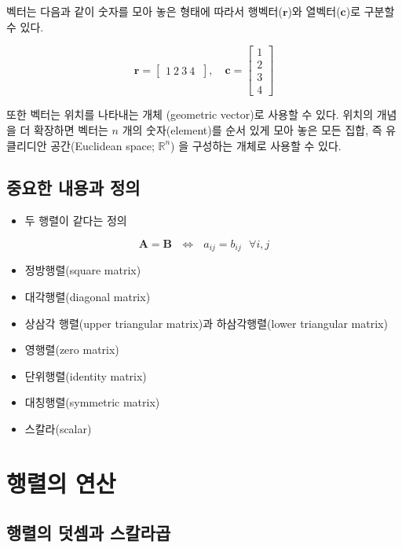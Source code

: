 \documentclass[
  11pt,
  a4paper,
  oneside]{scrbook}
\providecommand{\tightlist}{%
  \setlength{\itemsep}{0pt}\setlength{\parskip}{0pt}}\usepackage{longtable,booktabs,array}
\newcommand{\RR}{\mathbb{R}}
\theoremstyle{definition}
\theoremstyle{definition}
\theoremstyle{plain}
\theoremstyle{remark}
\begin{document}
벡터는 다음과 같이 숫자를 모아 놓은 형태에 따라서 행벡터(\(\pmb r\))와
열벡터(\(\pmb c\))로 구분할 수 있다.

\[
\pmb r = 
\begin{bmatrix}
1~ 2 ~3 ~4~
\end{bmatrix}
,\quad
\pmb c = 
\begin{bmatrix}
1 \\
2 \\
3 \\
4
\end{bmatrix}
\]

또한 벡터는 위치를 나타내는 개체 (geometric vector)로 사용할 수 있다.
위치의 개념을 더 확장하면 벡터는 \(n\) 개의 숫자(element)를 순서 있게
모아 놓은 모든 집합, 즉 유클리디안 공간(Euclidean space; \(\RR^n\)) 을
구성하는 개체로 사용할 수 있다.

\section{중요한 내용과
정의}\label{uxc911uxc694uxd55c-uxb0b4uxc6a9uxacfc-uxc815uxc758}

\begin{itemize}
\tightlist
\item
  두 행렬이 같다는 정의
\end{itemize}

\[ \pmb A = \pmb B  ~~~ \Leftrightarrow ~~~ a_{ij} =b_{ij} ~~~\forall i,j \]

\begin{itemize}
\tightlist
\item
  정방행렬(square matrix)
\item
  대각행렬(diagonal matrix)
\item
  상삼각 행렬(upper triangular matrix)과 하삼각행렬(lower triangular
  matrix)
\item
  영행렬(zero matrix)
\item
  단위행렬(identity matrix)
\item
  대칭행렬(symmetric matrix)
\item
  스칼라(scalar)
\end{itemize}


\chapter{행렬의 연산}\label{matrix_compute}

\section{행렬의 덧셈과
스칼라곱}\label{uxd589uxb82cuxc758-uxb367uxc148uxacfc-uxc2a4uxce7cuxb77cuxacf1}
\end{document}
